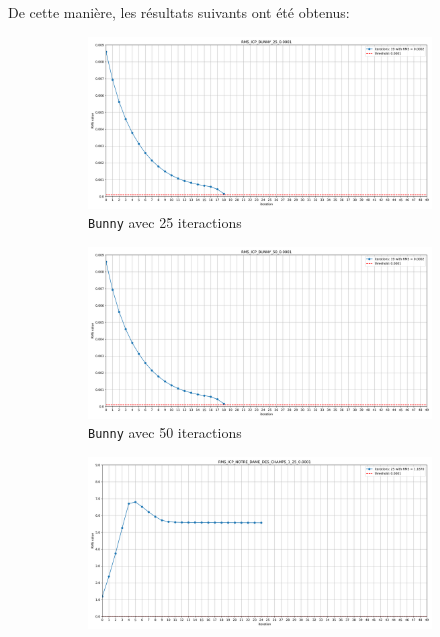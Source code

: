 \documentclass[../5RO17_TP4.tex]{subfiles}
\begin{document}
\noindent De cette manière, les résultats suivants ont été obtenus:
\begin{figure}[H]
    \centering
    \begin{subfigure}[b]{0.475\textwidth}
        \centering
        \includegraphics[width=\linewidth]{images/RMS_ICP_BUNNY_25_0.0001.png}
        \caption{\texttt{Bunny} avec 25 iteractions}
        \label{}
    \end{subfigure}\hfill
    \begin{subfigure}[b]{0.475\textwidth}
        \centering
        \includegraphics[width=\linewidth]{images/RMS_ICP_BUNNY_50_0.0001.png}
        \caption{\texttt{Bunny} avec 50 iteractions}
        \label{}
    \end{subfigure}\hfill
    \begin{subfigure}[b]{0.475\textwidth}
        \centering
        \includegraphics[width=\linewidth]{images/RMS_ICP_NOTRE_DAME_DES_CHAMPS_1_25_0.0001.png}

\end{subfigure}
\end{figure}
\end{document}
